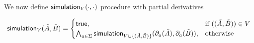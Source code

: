 We now define $\mathsf{simulation}_{V}(\cdot,\cdot)$ procedure with partial derivatives
\begin{definition}
\begin{align}
\mathsf{simulation}_{V}(\tilde{A},\tilde{B}) =\begin{cases}
			\mathsf{true}, & \text{if }((\tilde{A},\tilde{B})) \in V\\
                      \bigwedge_{a \in \Sigma}\mathsf{simulation}_{V \cup \{(\tilde{A},\tilde{B})\}}(\partial_{a}(\tilde{A}),\partial_{a}(\tilde{B})), & \text{otherwise}
		 \end{cases}
\end{align}
\end{definition}

